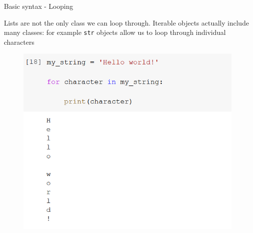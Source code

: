 \documentclass[aspectratio=169]{beamer}
\begin{document}
\begin{frame}{Basic syntax - Looping}

	Lists are not the only class we can loop through. Iterable objects actually include many classes: for example \texttt{str} objects allow us to loop through individual characters

	\begin{figure}
		\centering
		\includegraphics[width=0.55\linewidth]{img/string_loop.png}
	\end{figure}

\end{frame}
\end{document}

